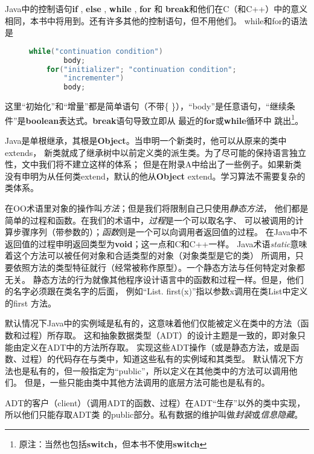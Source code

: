 Java中的控制语句\textbf{if} , \textbf{else} , \textbf{while} ,
\textbf{for} 和
\textbf{break}和他们在C（和C++）中的意义相同，本书中将用到。还有许多其他的控制语句，但不用他们。
while和for的语法是
\begin{figure}
\begin{lstlisting}[language={Java}, keywordstyle=\color{blue!70}, commentstyle=\color{red!50!green!50!blue!50}]
    while("continuation condition")
        body;
    for("initializer"; "continuation condition";
        "incrementer")
        body;
\end{lstlisting}
\end{figure}
\noindent 这里“初始化”和“增量”都是简单语句（不带\{
\}），“body”是任意语句，“继续条件”是\textbf{boolean}表达式。\textbf{break}语句导致立即从
最近的\textbf{for}或\textbf{while}循环中
跳出\footnote{原注：当然也包括\textbf{switch}，但本书不使用\textbf{switch}}。

Java是单根继承，其根是\textbf{Object}。当申明一个新类时，他可以从原来的类中extends，
新类就成了继承树中以前定义类的派生类。为了尽可能的保持语言独立性，文中我们将不建立这样的体系；
但是在附录A中给出了一些例子。如果新类没有申明为从任何类extend，默认的他从\textbf{Object}
extend。学习算法不需要复杂的类体系。

在OO术语里对象的操作叫\emph{方法}；但是我们将限制自己只使用\emph{静态方法}，
他们都是简单的过程和函数。在我们的术语中，\emph{过程}是一个可以取名字、
可以被调用的计算步骤序列（带参数的）；\emph{函数}则是一个可以向调用者返回值的过程。
在Java中不返回值的过程申明返回类型为\textbf{void}；这一点和C和C++一样。
Java术语\emph{static}意味着这个方法可以被任何对象和合适类型的对象（对象类型是它的类）
所调用，只要依照方法的类型特征就行（经常被称作原型）。一个静态方法与任何特定对象都无关。
静态方法的行为就像其他程序设计语言中的函数和过程一样。但是，他们的名字必须跟在类名字的后面，
例如“List. first(x)”指以参数x调用在类List中定义的first 方法。

默认情况下Java中的实例域是私有的，这意味着他们仅能被定义在类中的方法（函数和过程）所存取。
这和抽象数据类型（ADT）的设计主题是一致的，即对象只能由定义在ADT中的方法所存取。
实现这些ADT操作（或是静态方法，或是函数、过程）的代码存在与类中，知道这些私有的实例域和其类型。
默认情况下方法也是私有的，但一般指定为“public”，所以定义在其他类中的方法可以调用他们。
但是，一些只能由类中其他方法调用的底层方法可能也是私有的。

ADT的客户（client）（调用ADT的函数、过程）在ADT“生存”以外的类中实现，所以他们只能存取ADT类
的public部分。私有数据的维护叫做\emph{封装}或\emph{信息隐藏}。

